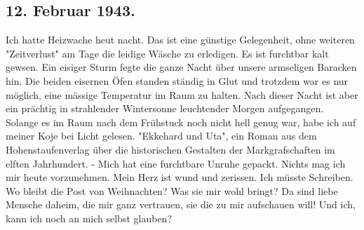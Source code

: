 \subsection{12. Februar 1943.}

Ich hatte Heizwache heut nacht.
Das ist eine g\"{u}nstige Gelegenheit, ohne weiteren "Zeitverlust" am Tage die leidige W\"{a}sche zu erledigen.
Es ist furchtbar kalt gewsen.
Ein eisiger Sturm fegte die ganze Nacht \"{u}ber unsere armseligen Baracken hin.
Die beiden eisernen \"{O}fen standen st\"{a}ndig in Glut und trotzdem war es nur m\"{o}glich, eine m\"{a}ssige Temperatur im Raum zu halten.
Nach dieser Nacht ist aber ein pr\"{a}chtig in strahlender Wintersonne leuchtender Morgen aufgegangen.
Solange es im Raum nach dem Fr\"{u}hstuck noch nicht hell genug war, habe ich auf meiner Koje bei Licht gelesen.
"Ekkehard und Uta", ein Roman aus dem Hohenstaufenverlag \"{u}ber die historischen Gestalten der Markgrafschaften im elften Jahrhundert.
- Mich hat eine furchtbare Unruhe gepackt.
Nichts mag ich mir heute vorzunehmen.
Mein Herz ist wund und zerissen.
Ich m\"{u}sste Schreiben.
Wo bleibt die Post von Weihnachten?
Was sie mir wohl bringt?
Da sind liebe Mensche daheim, die mir ganz vertrauen, sie die zu mir aufschauen will!
Und ich, kann ich noch an mich selbst glauben?

\clearpage
